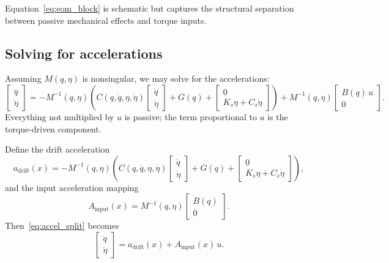 \documentclass[12pt]{article}
\newcommand{\qd}{\dot{q}}
\newcommand{\qdd}{\ddot{q}}
\newcommand{\etad}{\dot{\eta}}
\newcommand{\etadd}{\ddot{\eta}}
\begin{document}
Equation~\eqref{eq:eom_block} is schematic but captures the structural separation between passive mechanical effects and torque inputs.

\subsection{Solving for accelerations}

Assuming \(M(q,\eta)\) is nonsingular, we may solve for the accelerations:
\begin{equation}
  \begin{bmatrix}
    \qdd \\[0.2em]
    \etadd
  \end{bmatrix}
  =
  - M^{-1}(q,\eta)
  \left(
    C(q,\qd,\eta,\etad)
    \begin{bmatrix}
      \qd \\[0.2em]
      \etad
    \end{bmatrix}
    + G(q) +
    \begin{bmatrix}
      0 \\[0.2em]
      K_{s}\eta + C_{s}\etad
    \end{bmatrix}
  \right)
  +
  M^{-1}(q,\eta)
  \begin{bmatrix}
    B(q)\,u \\[0.2em]
    0
  \end{bmatrix}.
  \label{eq:accel_split}
\end{equation}
Everything not multiplied by \(u\) is passive; the term proportional to \(u\) is the torque-driven component.

Define the drift acceleration
\begin{equation}
  a_{\text{drift}}(x)
  =
  - M^{-1}(q,\eta)
  \left(
    C(q,\qd,\eta,\etad)
    \begin{bmatrix}
      \qd \\[0.2em]
      \etad
    \end{bmatrix}
    + G(q) +
    \begin{bmatrix}
      0 \\[0.2em]
      K_{s}\eta + C_{s}\etad
    \end{bmatrix}
  \right),
\end{equation}
and the input acceleration mapping
\begin{equation}
  A_{\text{input}}(x)
  =
  M^{-1}(q,\eta)
  \begin{bmatrix}
    B(q) \\[0.2em]
    0
  \end{bmatrix}.
\end{equation}
Then~\eqref{eq:accel_split} becomes
\begin{equation}
  \begin{bmatrix}
    \qdd \\[0.2em]
    \etadd
  \end{bmatrix}
  =
  a_{\text{drift}}(x) + A_{\text{input}}(x)\,u.
\end{equation}
\end{document}
